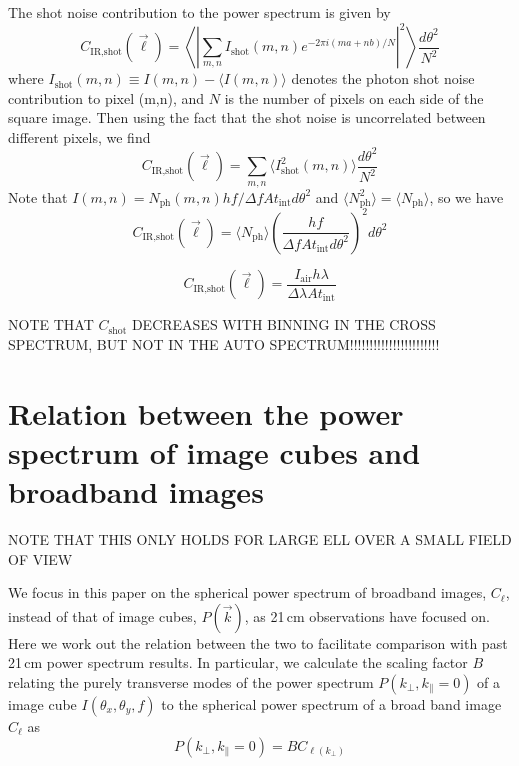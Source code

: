 \documentclass[preprint]{aastex}
\newcommand{\IR}{\text{IR}}
\newcommand{\shot}{\text{shot}}
\begin{document}
The shot noise contribution to the power spectrum is given by
\begin{equation}
C_{\IR, \shot}(\vec{\ell}) = \left\langle\left|\sum_{m,n}I_\shot(m,n)e^{-2\pi i(ma+nb)/N}\right|^2\right\rangle \frac{d\theta^2}{N^2}
\end{equation}
where $I_\shot(m,n)\equiv I(m,n)-\langle I(m,n)\rangle$ denotes the photon shot noise contribution to pixel (m,n), and $N$ is the number of pixels on each side of the square image. Then using the fact that the shot noise is uncorrelated between different pixels, we find
\begin{equation}
C_{\IR, \shot}(\vec{\ell}) = \sum_{m,n}\langle I^2_\shot(m,n)\rangle \frac{d\theta^2}{N^2}
\end{equation}
Note that $I(m,n)=N_\text{ph}(m,n)hf/\Delta f A t_\text{int}d\theta^2$ and $\langle N_\text{ph}^2\rangle = \langle N_\text{ph}\rangle$, so we have
\begin{equation}
C_{\IR, \shot}(\vec{\ell}) = \langle N_\text{ph}\rangle \left(\frac{hf}{\Delta f A t_\text{int}d\theta^2}\right)^2 d\theta^2
\end{equation}

\begin{equation}
C_{\IR, \shot}(\vec{\ell}) =\frac{I_\text{air}h\lambda}{\Delta \lambda A t_\text{int}}
\end{equation}

NOTE THAT $C_\shot$ DECREASES WITH BINNING IN THE CROSS SPECTRUM, BUT NOT IN THE AUTO SPECTRUM!!!!!!!!!!!!!!!!!!!!!!!

\section{Relation between the power spectrum of image cubes and broadband images}
\label{sec:pspecrelation}

NOTE THAT THIS ONLY HOLDS FOR LARGE ELL OVER A SMALL FIELD OF VIEW

We focus in this paper on the spherical power spectrum of broadband images, $C_\ell$,  instead of that of image cubes, $P(\vec{k})$, as 21\,cm observations have focused on. Here we work out the relation between the two to facilitate comparison with past 21\,cm power spectrum results. In particular, we calculate the scaling factor $B$ relating the purely transverse modes of the power spectrum $P(k_\perp,k_\parallel=0)$ of a image cube $I(\theta_x,\theta_y,f)$ to the spherical power spectrum of a broad band image $C_\ell$ as
\begin{equation}
P(k_\perp,k_\parallel=0) = B C_{\ell(k_\perp)}
\end{equation}
\end{document}
